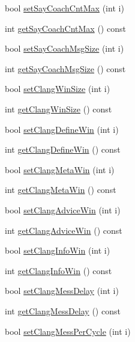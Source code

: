 \begin{DoxyCompactItemize}
\item 
bool \hyperlink{classServerSettings_aef0db584133e3de82eab8b7831edd012}{set\+Say\+Coach\+Cnt\+Max} (int i)
\item 
int \hyperlink{classServerSettings_afbbe8148cdd6bbd1f71fcfd6d8221c52}{get\+Say\+Coach\+Cnt\+Max} () const 
\item 
bool \hyperlink{classServerSettings_a364676341033fcf84864ff886fab0b80}{set\+Say\+Coach\+Msg\+Size} (int i)
\item 
int \hyperlink{classServerSettings_a3b893e1ff64c7a093f8e7a8aeb2e4c78}{get\+Say\+Coach\+Msg\+Size} () const 
\item 
bool \hyperlink{classServerSettings_a1d946a7ba1e7fb7cd850bf25f63b99a9}{set\+Clang\+Win\+Size} (int i)
\item 
int \hyperlink{classServerSettings_a4e1ee5930596949f0d02ad2da680efd9}{get\+Clang\+Win\+Size} () const 
\item 
bool \hyperlink{classServerSettings_a13b1fbe072e406531db2bef7634ce6f3}{set\+Clang\+Define\+Win} (int i)
\item 
int \hyperlink{classServerSettings_ad4df824d24102f31cbb1bc0589a188ef}{get\+Clang\+Define\+Win} () const 
\item 
bool \hyperlink{classServerSettings_ac1924326862cfd094f2f2dc43f1fdc78}{set\+Clang\+Meta\+Win} (int i)
\item 
int \hyperlink{classServerSettings_ab9d76317f9fd23484388c90a62d47c53}{get\+Clang\+Meta\+Win} () const 
\item 
bool \hyperlink{classServerSettings_a5dbeeca16ae5d2f4edfacd1c6a4667f3}{set\+Clang\+Advice\+Win} (int i)
\item 
int \hyperlink{classServerSettings_a35281fd5711b5fb974ba94769da2424a}{get\+Clang\+Advice\+Win} () const 
\item 
bool \hyperlink{classServerSettings_a766d4d70eee6abdb32f43c1a27df6c94}{set\+Clang\+Info\+Win} (int i)
\item 
int \hyperlink{classServerSettings_a3456116abfedbfde624c25256a2c37f3}{get\+Clang\+Info\+Win} () const 
\item 
bool \hyperlink{classServerSettings_afe7cdd619575361e06d4b060997aa43c}{set\+Clang\+Mess\+Delay} (int i)
\item 
int \hyperlink{classServerSettings_a4dc545d36594f05922fc8e61514cb606}{get\+Clang\+Mess\+Delay} () const 
\item 
bool \hyperlink{classServerSettings_a9e605b177fb5c414dbf59084c5ec5e10}{set\+Clang\+Mess\+Per\+Cycle} (int i)
\item 

\end{DoxyCompactItemize}
